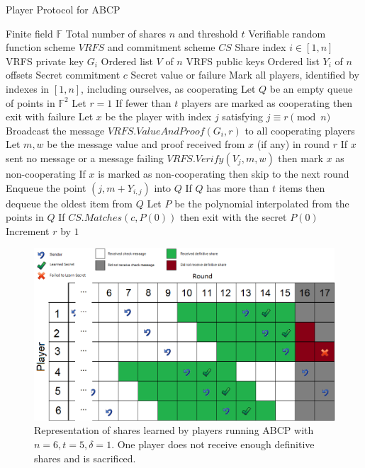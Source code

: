 \documentclass[12pt]{dalcsthesis}
\begin{document}
\begin{algorithm}
  \caption{Player Protocol for ABCP}
  \label{alg:ABCP:Player}
  \begin{algorithmic}
    \INPUT Finite field $\mathbb{F}$
    \INPUT Total number of shares $n$ and threshold $t$
    \INPUT Verifiable random function scheme $VRFS$ and commitment scheme $CS$
    \INPUT Share index $i \in [1, n]$
    \INPUT VRFS private key $G_i$
    \INPUT Ordered list $V$ of $n$ VRFS public keys
    \INPUT Ordered list $Y_i$ of $n$ offsets
    \INPUT Secret commitment $c$
    \OUTPUT Secret value or failure
    \STATE Mark all players, identified by indexes in $[1,n]$, including ourselves, as cooperating
    \STATE Let $Q$ be an empty queue of points in $\mathbb{F}^2$
    \STATE Let $r = 1$
	  \STATE If fewer than $t$ players are marked as cooperating then exit with failure
	  \STATE Let $x$ be the player with index $j$ satisfying $j \equiv r \pmod{n}$
	  	 \STATE Broadcast the message $VRFS.ValueAndProof(G_i, r)$ to all cooperating players
	  \ENDIF
	  \STATE Let $m, w$ be the message value and proof received from $x$ (if any) in round $r$
	  \STATE If $x$ sent no message or a message failing $VRFS.Verify(V_j, m, w)$ then mark $x$ as non-cooperating
	  \STATE If $x$ is marked as non-cooperating then skip to the next round
	  \STATE Enqueue the point $(j, m + Y_{i,j})$ into $Q$
      \STATE If $Q$ has more than $t$ items then dequeue the oldest item from $Q$
	   	\STATE Let $P$ be the polynomial interpolated from the points in $Q$
	    \STATE If $CS.Matches(c, P(0))$ then exit with the secret $P(0)$
	  \ENDIF
      \STATE Increment $r$ by $1$
	\ENDWHILE
  \end{algorithmic}
\end{algorithm}
\begin{figure}
\includegraphics[width=\textwidth]{../../Graphics/AsyncVerifiedSecret_n6t5d1.png}
\caption[Shares learned by players running ABCP]{Representation of shares learned by players running ABCP with $n=6, t=5, \delta=1$. One player does not receive enough definitive shares and is sacrificed.}
\label{img:ex:ABCP}
\end{figure}
\end{document}
